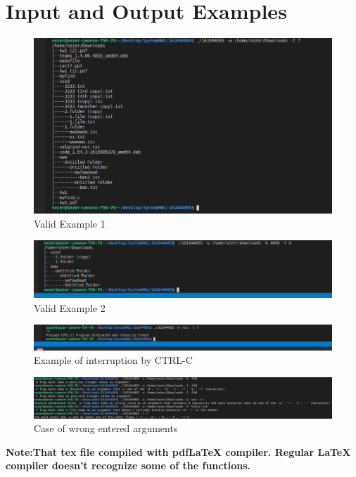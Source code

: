\documentclass{article}
\begin{document}
\newpage
\section{Input and Output Examples}

\begin{figure}[!htb]
    \includegraphics[scale = 0.3]{./LatexImages/output1.png}
    \caption{Valid Example 1}
\end{figure}


\begin{figure}[!htb]
    \includegraphics[scale = 0.3]{./LatexImages/output2.png}
    \caption{Valid Example 2}
\end{figure}

\begin{figure}[!htb]
    \includegraphics[scale = 0.4]{./LatexImages/output3.png}
\caption{Example of interruption by CTRL-C}
\end{figure}

\begin{figure}[!htb]
    \includegraphics[scale = 0.4]{./LatexImages/output4.png}
\caption{Case of wrong entered arguments}
\end{figure}

\hspace{\parindent}\textbf{Note:That tex file compiled with pdfLaTeX compiler. Regular LaTeX compiler doesn't recognize some of the functions.} \par
\end{document}
